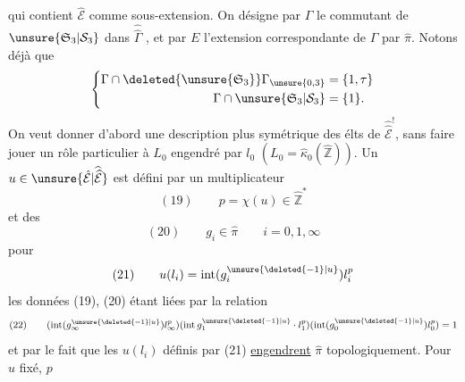 qui contient $\hat{\mathcal E}$ comme sous-extension. On désigne par $\Gamma$ le commutant de $\unsure{\mathfrak S_3|\mathcal S_3}$ dans $\widehat{\widehat\Gamma}$ , et par $E$ l'extension correspondante de $\Gamma$ par $\hat\pi$. Notons déjà que
\[
\left\{\begin{aligned}
\Gamma\cap\deleted{\unsure{\mathfrak S_3}}\Gamma_{\unsure{0,3}}&=\{1,\tau\}\\
\Gamma\cap\unsure{\mathfrak S_3|\mathcal S_3}&=\{1\}.
\end{aligned}\right.
\]
On veut donner d'abord une description plus symétrique des élts de $\widehat{\widehat{\mathcal E}}^!$, sans faire jouer un rôle particulier à $L_0$ engendré par $l_0$ $(L_0=\hat\kappa_0(\hat{\mathbb Z}))$. Un $u\in\unsure{\hat{\mathcal E}|\widehat{\widehat{\mathcal E}}}$ est  défini par un multiplicateur
\[
(19)\qquad p=\chi(u)\in\hat{\mathbb Z}^{*}
\]
et des
\[
(20)\qquad g_i\in\hat\pi\qquad i=0,1,\infty
\]
pour
\[
(21)\qquad u(l_i)=\operatorname{int}(g_i^{\unsure{\deleted{-1}|u}})l_i^p
\]
les données (19), (20) étant liées par la relation
\[
(22)\qquad(\operatorname{int}(g_\infty^{\unsure{\deleted{-1}|u}})l_\infty^p)
(\operatorname{int}g_1^{\unsure{\deleted{-1}|u}}\cdot l_1^p)
(\operatorname{int}(g_0^{\unsure{\deleted{-1}|u}})l_0^p)=1
\]
et par le fait que les $u(l_i)$ définis par (21) \uline{engendrent} $\hat\pi$ topologiquement. Pour $u$ fixé, $p$
